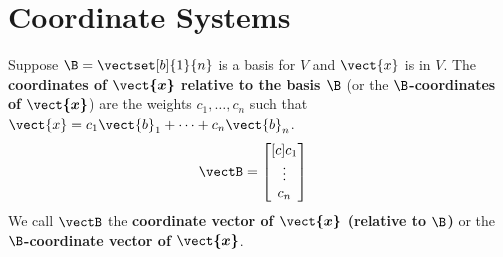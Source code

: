 \newpage


\section{Coordinate Systems}
\name

\begin{boxdef}
	Suppose $\B=\vectset[b]{1}{n}$ is a basis for $V$ and $\vect{x}$ is in $V$. The \textbf{coordinates of $\boldsymbol{\vect{x}}$ relative to the basis $\boldsymbol{\B}$} (or the $\boldsymbol{\B}$\textbf{-coordinates of} $\boldsymbol{\vect{x}}$) are the weights $c_1,\ldots,c_n$ such that $\vect{x} = c_1\vect{b}_1 + \cdots + c_n\vect{b}_n$.
	\begin{align*}
	\vectB &= \begin{bmatrix}[c]c_1 \\ \vdots \\ c_n\end{bmatrix}
	\end{align*}
	We call $\vectB$ the \textbf{coordinate vector of $\boldsymbol{\vect{x}}$ (relative to $\boldsymbol{\B}$)} or the \textbf{$\boldsymbol{\B}$-coordinate vector of $\boldsymbol{\vect{x}}$}.
\end{boxdef}


